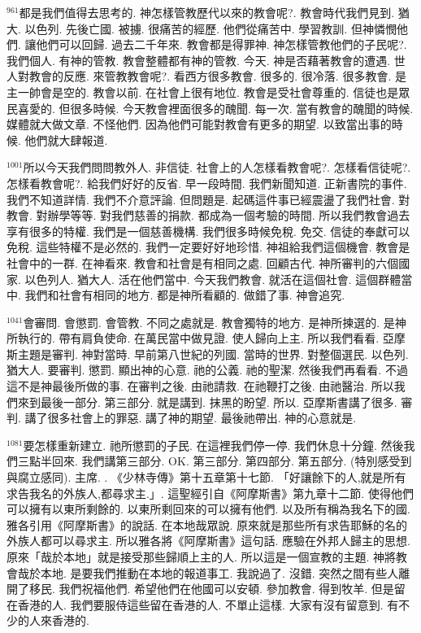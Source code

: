 \documentclass{book}
\begin{document}
$^{961}$都是我們值得去思考的.
神怎樣管教歷代以來的教會呢?.
教會時代我們見到.
猶大.
以色列.
先後亡國.
被擄.
很痛苦的經歷.
他們從痛苦中.
學習教訓.
但神憐憫他們.
讓他們可以回歸.
過去二千年來.
教會都是得罪神.
神怎樣管教他們的子民呢?.
我們個人.
有神的管教.
教會整體都有神的管教.
今天.
神是否藉著教會的遭遇.
世人對教會的反應.
來管教教會呢?.
看西方很多教會.
很多的.
很冷落.
很多教會.
是主一帥會是空的.
教會以前.
在社會上很有地位.
教會是受社會尊重的.
信徒也是眾民喜愛的.
但很多時候.
今天教會裡面很多的醜聞.
每一次.
當有教會的醜聞的時候.
媒體就大做文章.
不怪他們.
因為他們可能對教會有更多的期望.
以致當出事的時候.
他們就大肆報道.

$^{1001}$所以今天我們問問教外人.
非信徒.
社會上的人怎樣看教會呢?.
怎樣看信徒呢?.
怎樣看教會呢?.
給我們好好的反省.
早一段時間.
我們新聞知道.
正新書院的事件.
我們不知道詳情.
我們不介意評論.
但問題是.
起碼這件事已經震盪了我們社會.
對教會.
對辦學等等.
對我們慈善的捐款.
都成為一個考驗的時間.
所以我們教會過去享有很多的特權.
我們是一個慈善機構.
我們很多時候免稅.
免交.
信徒的奉獻可以免稅.
這些特權不是必然的.
我們一定要好好地珍惜.
神祖給我們這個機會.
教會是社會中的一群.
在神看來.
教會和社會是有相同之處.
回顧古代.
神所審判的六個國家.
以色列人.
猶大人.
活在他們當中.
今天我們教會.
就活在這個社會.
這個群體當中.
我們和社會有相同的地方.
都是神所看顧的.
做錯了事.
神會追究.

$^{1041}$會審問.
會懲罰.
會管教.
不同之處就是.
教會獨特的地方.
是神所揀選的.
是神所執行的.
帶有肩負使命.
在萬民當中做見證.
使人歸向上主.
所以我們看看.
亞摩斯主題是審判.
神對當時.
早前第八世紀的列國.
當時的世界.
對整個選民.
以色列.
猶大人.
要審判.
懲罰.
顯出神的心意.
祂的公義.
祂的聖潔.
然後我們再看看.
不過這不是神最後所做的事.
在審判之後.
由祂請救.
在祂鞭打之後.
由祂醫治.
所以我們來到最後一部分.
第三部分.
就是講到.
抹黑的盼望.
所以.
亞摩斯書講了很多.
審判.
講了很多社會上的罪惡.
講了神的期望.
最後祂帶出.
神的心意就是.

$^{1081}$要怎樣重新建立.
祂所懲罰的子民.
在這裡我們停一停.
我們休息十分鐘.
然後我們三點半回來.
我們講第三部分.
OK.
第三部分.
第四部分.
第五部分.
(特別感受到與腐立感同).
主席.
.
《少林寺傳》第十五章第十七節.
「好讓餘下的人,就是所有求告我名的外族人,都尋求主.」.
這聖經引自《阿摩斯書》第九章十二節.
使得他們可以擁有以東所剩餘的.
以東所剩回來的可以擁有他們.
以及所有稱為我名下的國.
雅各引用《阿摩斯書》的說話.
在本地哉眾說.
原來就是那些所有求告耶穌的名的外族人都可以尋求主.
所以雅各將《阿摩斯書》這句話.
應驗在外邦人歸主的思想.
原來「哉於本地」就是接受那些歸順上主的人.
所以這是一個宣教的主題.
神將教會哉於本地.
是要我們推動在本地的報道事工.
我說過了.
沒錯.
突然之間有些人離開了移民.
我們祝福他們.
希望他們在他國可以安頓.
參加教會.
得到牧羊.
但是留在香港的人.
我們要服侍這些留在香港的人.
不單止這樣.
大家有沒有留意到.
有不少的人來香港的.
\end{document}
